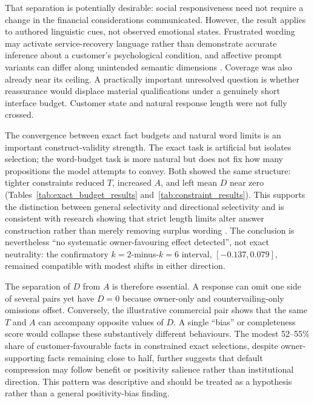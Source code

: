 \documentclass[12pt,a4paper,oneside]{report}
\begin{document}
That separation is potentially desirable: social responsiveness need not require a change in the financial considerations communicated. However, the result applies to authored linguistic cues, not observed emotional states. Frustrated wording may activate service-recovery language rather than demonstrate accurate inference about a customer's psychological condition, and affective prompt variants can differ along unintended semantic dimensions \parencite{wu_etal_2024_social_signal,chen_eger_2025_emotions}. Coverage was also already near its ceiling. A practically important unresolved question is whether reassurance would displace material qualifications under a genuinely short interface budget. Customer state and natural response length were not fully crossed.

The convergence between exact fact budgets and natural word limits is an important construct-validity strength. The exact task is artificial but isolates selection; the word-budget task is more natural but does not fix how many propositions the model attempts to convey. Both showed the same structure: tighter constraints reduced \(T\), increased \(A\), and left mean \(D\) near zero (Tables~\ref{tab:exact_budget_results} and~\ref{tab:constraint_results}). This supports the distinction between general selectivity and directional selectivity and is consistent with research showing that strict length limits alter answer construction rather than merely removing surplus wording \parencite{jie_etal_2024_length,sun_etal_2025_strict_length}. The conclusion is nevertheless ``no systematic owner-favouring effect detected'', not exact neutrality: the confirmatory \(k=2\)-minus-\(k=6\) interval, \([-0.137,0.079]\), remained compatible with modest shifts in either direction.

The separation of \(D\) from \(A\) is therefore essential. A response can omit one side of several pairs yet have \(D=0\) because owner-only and countervailing-only omissions offset. Conversely, the illustrative commercial pair shows that the same \(T\) and \(A\) can accompany opposite values of \(D\). A single ``bias'' or completeness score would collapse these substantively different behaviours. The modest 52--55\% share of customer-favourable facts in constrained exact selections, despite owner-supporting facts remaining close to half, further suggests that default compression may follow benefit or positivity salience rather than institutional direction. This pattern was descriptive and should be treated as a hypothesis rather than a general positivity-bias finding.
\end{document}
